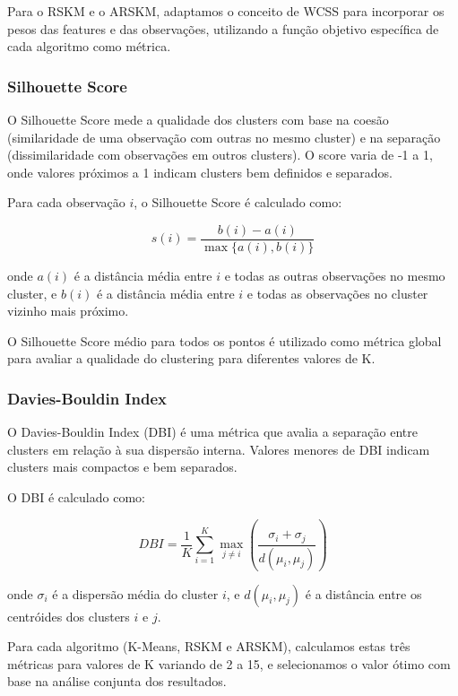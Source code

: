 \documentclass[conference]{IEEEtran}
\begin{document}
Para o RSKM e o ARSKM, adaptamos o conceito de WCSS para incorporar os pesos das features e das observações, utilizando a função objetivo específica de cada algoritmo como métrica.

\subsubsection{Silhouette Score}
O Silhouette Score mede a qualidade dos clusters com base na coesão (similaridade de uma observação com outras no mesmo cluster) e na separação (dissimilaridade com observações em outros clusters). O score varia de -1 a 1, onde valores próximos a 1 indicam clusters bem definidos e separados.

Para cada observação $i$, o Silhouette Score é calculado como:

\begin{equation}
s(i) = \frac{b(i) - a(i)}{\max\{a(i), b(i)\}}
\end{equation}

onde $a(i)$ é a distância média entre $i$ e todas as outras observações no mesmo cluster, e $b(i)$ é a distância média entre $i$ e todas as observações no cluster vizinho mais próximo.

O Silhouette Score médio para todos os pontos é utilizado como métrica global para avaliar a qualidade do clustering para diferentes valores de K.

\subsubsection{Davies-Bouldin Index}
O Davies-Bouldin Index (DBI) é uma métrica que avalia a separação entre clusters em relação à sua dispersão interna. Valores menores de DBI indicam clusters mais compactos e bem separados.

O DBI é calculado como:

\begin{equation}
DBI = \frac{1}{K} \sum_{i=1}^{K} \max_{j \neq i} \left( \frac{\sigma_i + \sigma_j}{d(\mu_i, \mu_j)} \right)
\end{equation}

onde $\sigma_i$ é a dispersão média do cluster $i$, e $d(\mu_i, \mu_j)$ é a distância entre os centróides dos clusters $i$ e $j$.

Para cada algoritmo (K-Means, RSKM e ARSKM), calculamos estas três métricas para valores de K variando de 2 a 15, e selecionamos o valor ótimo com base na análise conjunta dos resultados.
\end{document}
